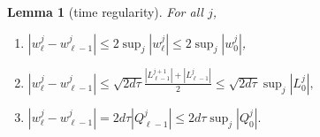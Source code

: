 \documentclass[a4paper,11pt]{article}
\def\l{{h}}
\def\Lip{{\mathrm{Lip}}}
\newtheorem{lemma}{Lemma}[section]
\theoremstyle{remark}
\begin{document}
\begin{lemma}[time regularity] \label{uniform_est_time}
 For all $j$, 
 \begin{enumerate}
  \item $\left|w^j_\ell - w^j_{\ell-1}\right| \le 2\displaystyle \sup _{j} |w^j_\ell| \le 2\displaystyle \sup _{j} |w^j_0|$, 
  \item $\left|w^j_\ell - w^j_{\ell-1}\right| \le \sqrt{2d\tau}\displaystyle \frac{|L^{j+1}_{\ell-1}| + |L^{j}_{\ell-1}|}{2}\le \sqrt{2d\tau}\displaystyle\sup _{j} |L^j_{0}|,$
  \item $\left|w^j_\ell - w^j_{\ell-1}\right| = 2d\tau |Q^j_{\ell-1}| \le 2d\tau\displaystyle\sup _{j} |Q^j_{0}|.$
 \end{enumerate}
\end{lemma}
\end{document}
